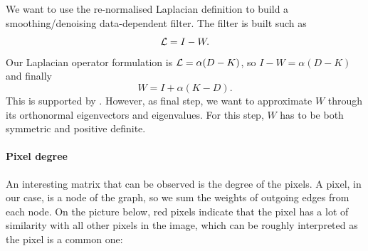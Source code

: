 We want to use the re-normalised Laplacian definition to build a smoothing/denoising data-dependent filter.
The filter is built such as
\[\operatorname{\mathcal{L}} = I-W.\]
Our Laplacian operator formulation is \(\operatorname{\mathcal{L}} = \alpha (D-K)\), so \(I-W = \alpha (D-K)\) and finally
\[W = I + \alpha (K-D).\]
This is supported by \cite{milanfar_new_2016}.
However, as final step, we want to approximate \(W\) through its orthonormal eigenvectors and eigenvalues.
For this step, \(W\) has to be both symmetric and positive definite.

\paragraph{Pixel degree}

An interesting matrix that can be observed is the degree of the pixels.
A pixel, in our case, is a node of the graph, so we sum the weights of outgoing edges from each node.
On the picture below, red pixels indicate that the pixel has a lot of similarity with all other pixels in the image, which can be roughly interpreted as the pixel is a common one:

